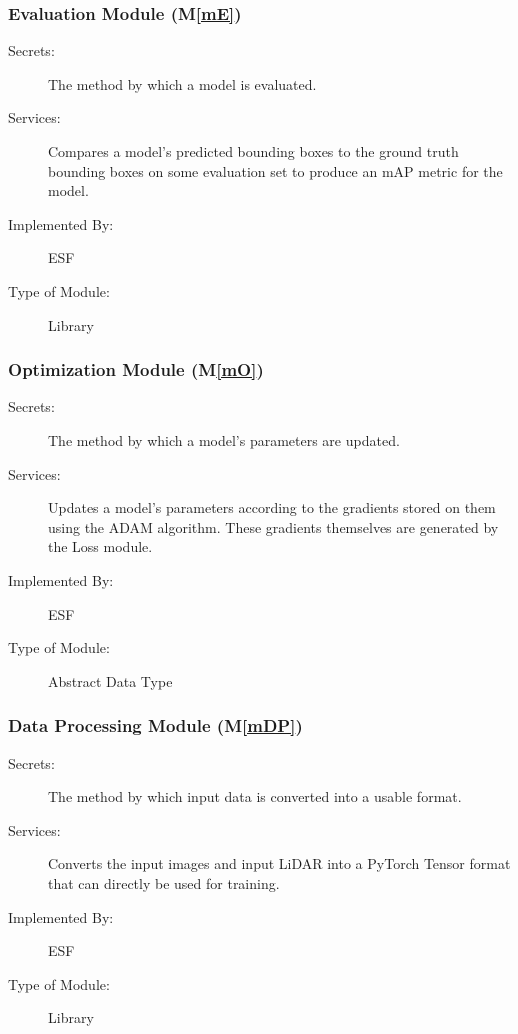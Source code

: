 \documentclass[12pt, titlepage]{article}
\newcommand{\ProjectName}{ESF }
\newcommand{\mref}[1]{M\ref{#1}}
\begin{document}
\subsubsection{Evaluation Module (\mref{mE})}
\begin{description}
\item[Secrets:] The method by which a model is evaluated. 
\item[Services:] Compares a model's predicted bounding boxes to the ground truth bounding boxes on some evaluation set to produce an mAP metric for the model.
\item[Implemented By:] \ProjectName{}
\item[Type of Module:] Library
\end{description}

\subsubsection{Optimization Module (\mref{mO})}
\begin{description}
\item[Secrets:] The method by which a model's parameters are updated.
\item[Services:] Updates a model's parameters according to the gradients stored on them using the ADAM algorithm. These gradients themselves are generated by the Loss module.
\item[Implemented By:] \ProjectName{}
\item[Type of Module:] Abstract Data Type
\end{description}

\subsubsection{Data Processing Module (\mref{mDP})}
\begin{description}
\item[Secrets:] The method by which input data is converted into a usable format.
\item[Services:] Converts the input images and input LiDAR into a PyTorch Tensor format that can directly be used for training.
\item[Implemented By:] \ProjectName{} 
\item[Type of Module:] Library
\end{description}
\end{document}

